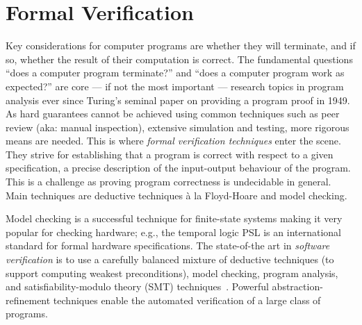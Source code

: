 \documentclass[sigplan,10pt]{acmart}\settopmatter{printfolios=true,printccs=false,printacmref=false}
\begin{document}
\maketitle

\section{Formal Verification}

Key considerations for computer programs are whether they will terminate, and if so, whether the result of their computation is correct.
The fundamental questions ``does a computer program terminate?'' and ``does a computer program work as expected?'' are core --- if not the most important --- research topics in program analysis ever since Turing's seminal paper on providing a program proof in 1949.
As hard guarantees cannot be achieved using common techniques such as peer review (aka: manual inspection), extensive simulation and testing, more rigorous means are needed. 
This is where \emph{formal verification techniques} enter the scene.
They strive for establishing that a program is correct with respect to a given specification, a precise description of the input-output behaviour of the program.
This is a challenge as proving program correctness is undecidable in general.
Main techniques are deductive techniques \`a la Floyd-Hoare and model checking. 

Model checking is a successful technique for finite-state systems making it very popular for checking hardware; e.g., the temporal logic PSL is an international standard for formal hardware specifications.
The state-of-the art in \emph{software verification} is to use a carefully balanced mixture of deductive techniques (to support computing weakest preconditions), model checking, program analysis, and satisfiability-modulo theory (SMT) techniques~\cite{DBLP:journals/csur/JhalaM09}.
Powerful abstraction-refinement techniques enable the automated verification of a large class of programs. 
\end{document}
